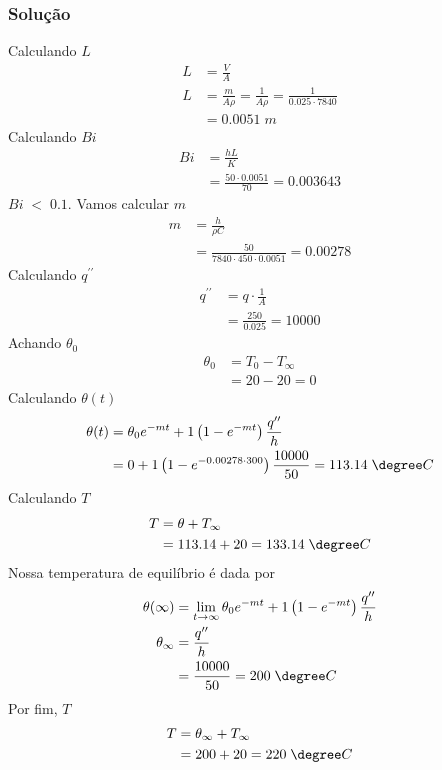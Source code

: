 \subsubsection{Solução}
Calculando \(L\)
\begin{align}
    L &= \frac{V}{A}\\
    L &= \frac{m}{A\rho} = \frac{1}{A \rho} = \frac{1}{0.025 \cdot 7840}\\
    &= 0.0051 \; m
\end{align}
Calculando \(Bi\)
\begin{align}
    Bi &= \frac{h L}{K}\\
    &= \frac{50 \cdot 0.0051}{70}  = 0.003643
\end{align}  
\(Bi \; < \; 0.1\). Vamos calcular \(m\) 
\begin{align}
    m &= \frac{h}{\rho C}\\
    &= \frac{50}{7840 \cdot 450 \cdot 0.0051} = 0.00278
\end{align}
Calculando \(q^{\prime\prime}\)
\begin{align}
    q^{\prime\prime} &=  q \cdot \frac{1}{A}\\
    &= \frac{250}{0.025} = 10000
\end{align}
Achando \(\theta _0\) 
\begin{align}
    \theta _0 &= T_0 - T_\infty \\
    &= 20 - 20 = 0
\end{align}
Calculando \(\theta (t)\)
\begin{align}
    \theta (t) &= \theta_0 e^{-mt} + 1 \left( 1 - e^{-mt} \right) \frac{q^{\prime\prime} }{h} \\
    &= 0 + 1 \left( 1 - e^{-0.00278 \cdot 300} \right) \frac{10000}{50} = 113.14 \; \degree C \\
\end{align}
Calculando \(T\) 
\begin{align}
    T &= \theta + T_\infty \\
    &= 113.14 + 20 = 133.14 \; \degree C
\end{align}
Nossa temperatura de equilíbrio é dada por
\begin{align}
    \theta (\infty ) &= \lim_{t \to \infty}  \theta_0 e^{-mt} + 1 \left( 1 - e^{-mt} \right) \frac{q^{\prime\prime} }{h} \\
    \theta _\infty &= \frac{q^{\prime\prime} }{h} \\
    &= \frac{10000}{50} = 200 \; \degree C
\end{align}
Por fim, \(T\)
\begin{align}
    T &= \theta _\infty + T_\infty \\
    &= 200 + 20 = 220 \; \degree C
\end{align} 
